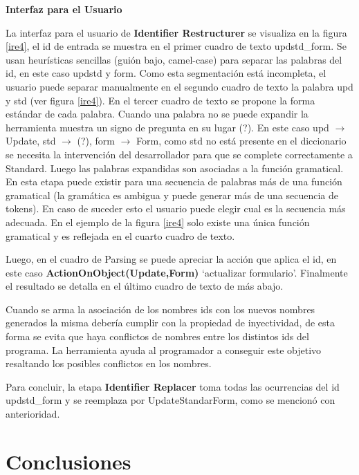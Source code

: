 \documentclass[a4paper,12pt]{report}
\begin{document}
\pagebreak
\noindent \textbf{Interfaz para el Usuario\\}

La interfaz para el usuario de \textbf{Identifier Restructurer} se visualiza en la figura \ref{ire4}, el id de entrada se muestra en el primer cuadro de texto \textsf{updstd\_form}. Se usan heurísticas sencillas (guión bajo, camel-case) para separar las palabras del id, en este caso \textsf{updstd} y \textsf{form}. Como esta segmentación está incompleta, el usuario puede separar manualmente en el segundo cuadro de texto la palabra \textsf{upd} y \textsf{std} (ver figura \ref{ire4}). En el tercer cuadro de texto se propone la forma estándar de cada palabra. Cuando una palabra no se puede expandir la herramienta muestra un signo de pregunta en su lugar (?). En este caso \textsf{upd} $\rightarrow$ \textsf{Update}, \textsf{std} $\rightarrow$ (?), \textsf{form} $\rightarrow$ \textsf{Form}, como \textsf{std} no está presente en el diccionario se necesita la intervención del desarrollador para que se complete correctamente a \textsf{Standard}. Luego las palabras expandidas son asociadas a la función gramatical. En esta etapa puede existir para una secuencia de palabras más de una función gramatical (la gramática es ambigua y puede generar más de una secuencia de tokens). En caso de suceder esto el usuario puede elegir cual es la secuencia más adecuada. En el ejemplo de la figura \ref{ire4} solo existe una única función gramatical y es reflejada en el cuarto cuadro de texto. 

Luego, en el cuadro de Parsing se puede apreciar la acción que aplica el id, en este caso \textbf{ActionOnObject(Update,Form)} `actualizar formulario'. Finalmente el resultado se detalla en el último cuadro de texto de más abajo.

Cuando se arma la asociación de los nombres ids con los nuevos nombres generados la misma debería cumplir con la propiedad de inyectividad, de esta forma se evita que haya conflictos de nombres entre los distintos ids del programa. La herramienta ayuda al programador a conseguir este objetivo resaltando los posibles conflictos en los nombres.

Para concluir, la etapa \textbf{Identifier Replacer} toma todas las ocurrencias del id \textsf{updstd\_form} y se reemplaza por \textsf{UpdateStandarForm}, como se mencionó con anterioridad.

\section{Conclusiones}
\end{document}
